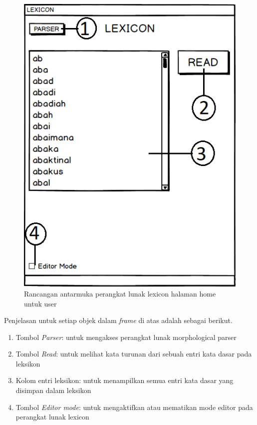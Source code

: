 \begin{figure}[H]
\centering
\includegraphics[scale=0.8]{Gambar/mockup-lexicon-home-user}
\caption{Rancangan antarmuka perangkat lunak lexicon halaman home untuk user} 
\label{mockup-lexicon-home-user}
\end{figure}

Penjelasan untuk setiap objek dalam \textit{frame} di atas adalah sebagai berikut.

\begin{enumerate}
	\item Tombol \textit{Parser}: untuk mengakses perangkat lunak morphological parser
	\item Tombol \textit{Read}: untuk melihat kata turunan dari sebuah entri kata dasar pada leksikon
	\item Kolom entri leksikon: untuk menampilkan semua entri kata dasar yang disimpan dalam leksikon
	\item Tombol \textit{Editor mode}: untuk mengaktifkan atau mematikan mode editor pada perangkat lunak lexicon
\end{enumerate}

